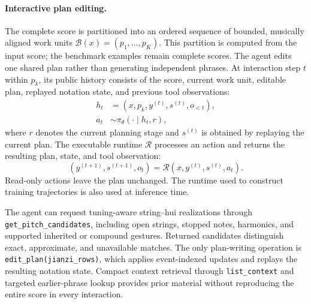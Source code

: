 \documentclass[11pt]{article}
\begin{document}
\paragraph{Interactive plan editing.}
The complete score is partitioned into an ordered sequence of bounded, musically aligned work units $\mathcal{B}(x)=(p_1,\ldots,p_K)$. This partition is computed from the input score; the benchmark examples remain complete scores. The agent edits one shared plan rather than generating independent phrases. At interaction step $t$ within $p_k$, its public history consists of the score, current work unit, editable plan, replayed notation state, and previous tool observations:
\begin{equation}
    \begin{aligned}
        h_t&=(x,p_k,y^{(t)},s^{(t)},o_{<t}),\\
        a_t&\sim\pi_\theta(\cdot\mid h_t,r),
    \end{aligned}
    \label{eq:policy}
\end{equation}
where $r$ denotes the current planning stage and $s^{(t)}$ is obtained by replaying the current plan. The executable runtime $\mathcal{R}$ processes an action and returns the resulting plan, state, and tool observation:
\begin{equation}
    (y^{(t+1)},s^{(t+1)},o_t)
    =\mathcal{R}(x,y^{(t)},s^{(t)},a_t).
    \label{eq:runtime}
\end{equation}
Read-only actions leave the plan unchanged. The runtime used to construct training trajectories is also used at inference time.

The agent can request tuning-aware string--hui realizations through \texttt{get\_pitch\_candidates}, including open strings, stopped notes, harmonics, and supported inherited or compound gestures. Returned candidates distinguish exact, approximate, and unavailable matches. The only plan-writing operation is \texttt{edit\_plan(jianzi\_rows)}, which applies event-indexed updates and replays the resulting notation state. Compact context retrieval through \texttt{list\_context} and targeted earlier-phrase lookup provides prior material without reproducing the entire score in every interaction.
\end{document}
